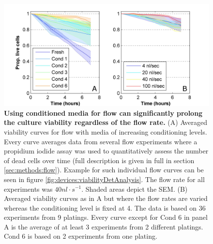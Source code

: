     \begin{figure}[h]
            \centering
            \includegraphics[width=15cm]{chapter4/figures/condImpression/condImpression.jpg}
            \caption[Effect of media conditioning and flow rate on viability of neuronal cultures under steady microfluidic flow]{\textbf{Using conditioned media for flow can significantly prolong the culture viability regardless of the flow rate.} (A) Averaged viability curves for flow with media of increasing conditioning levels. Every curve averages data from several flow experiments where a propidium iodide assay was used to quantitatively assess the number of dead cells over time (full description is given in full in section \ref{sec:methods:flow}). Example for such individual flow curves can be seen in figure \ref{fig:devices:viabilityDetAnalysis}. The flow rate for all experiments was \(40 nl\cdot s^{-1}\). Shaded areas depict the SEM. (B) Averaged viability curves as in A but where the flow rates are varied whereas the conditioning level is fixed at 4. The data is based on 36 experiments from 9 platings. Every curve except for Cond 6 in panel A is the average of at least 3 experiments from 2 different platings. Cond 6 is based on 2 experiments from one plating.}
            \label{fig:devices:viabilityImpression}

    \end{figure}


